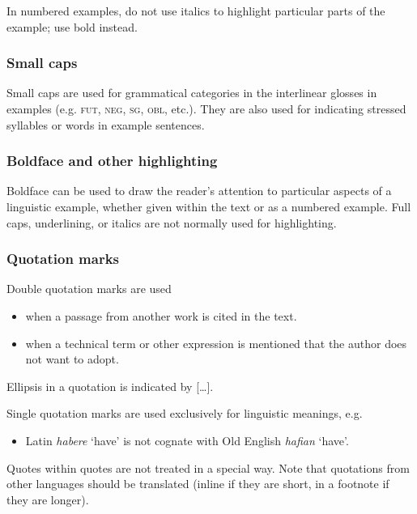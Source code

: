 \documentclass[charis,linguex]{glossa}
\begin{document}
In numbered examples, do not use italics to highlight particular parts of the example; use bold instead.

\fussy

\subsubsection{Small caps} 

Small caps are used for grammatical categories in the interlinear glosses in examples (e.g. \textsc{fut, neg, sg, obl}, etc.). They are also used for indicating stressed syllables or words in example sentences. 

\subsubsection{Boldface and other highlighting}
Boldface can be used to draw the reader’s attention to particular aspects of a linguistic example, whether given within the text or as a numbered example. Full caps, underlining, or italics are not normally used for highlighting.

\subsubsection{Quotation marks}
Double quotation marks are used

\begin{itemize}
\item when a passage from another work is cited in the text.
\item when a technical term or other expression is mentioned that the author does not want to adopt.
\end{itemize}
Ellipsis in a quotation is indicated by [\ldots].

Single quotation marks are used exclusively for linguistic meanings, e.g.
\begin{itemize}
\item Latin \textit{habere} ‘have’ is not cognate with Old English \textit{hafian} ‘have’.
\end{itemize}
Quotes within quotes are not treated in a special way.
Note that quotations from other languages should be translated (inline if they are short, in a footnote if they are longer).
\end{document}

